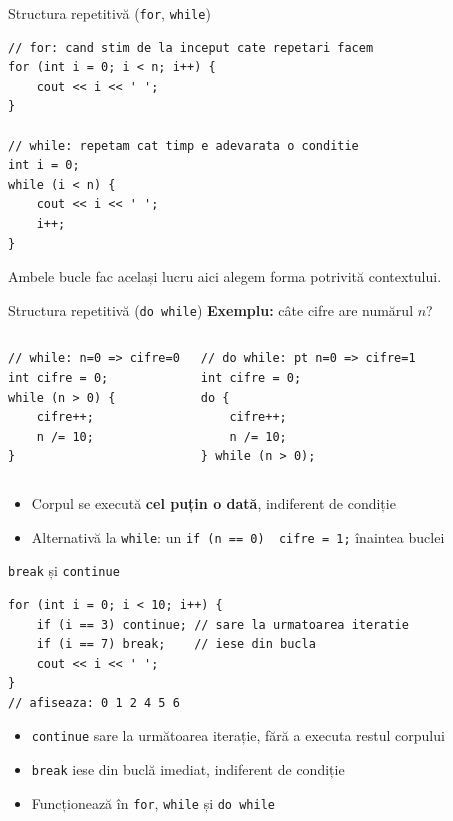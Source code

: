 \documentclass{beamer}
\begin{document}
\begin{frame}[fragile]{Structura repetitivă (\texttt{for}, \texttt{while})}
  \begin{lstlisting}
// for: cand stim de la inceput cate repetari facem
for (int i = 0; i < n; i++) {
    cout << i << ' ';
}

// while: repetam cat timp e adevarata o conditie
int i = 0;
while (i < n) {
    cout << i << ' ';
    i++;
}
  \end{lstlisting}
  Ambele bucle fac același lucru aici \textemdash{} alegem forma potrivită contextului.
\end{frame}

\begin{frame}[fragile]{Structura repetitivă (\texttt{do while})}
  \textbf{Exemplu:} câte cifre are numărul $n$?

  \begin{columns}[T]
    \begin{lstlisting}
// while: n=0 => cifre=0
int cifre = 0;
while (n > 0) {
    cifre++;
    n /= 10;
}
    \end{lstlisting}
    \begin{lstlisting}
// do while: pt n=0 => cifre=1
int cifre = 0;
do {
    cifre++;
    n /= 10;
} while (n > 0);
    \end{lstlisting}
  \end{columns}

  \begin{itemize}
    \item Corpul se execută \textbf{cel puțin o dată}, indiferent de condiție
    \item Alternativă la \lstinline|while|: un \lstinline|if (n == 0)  cifre = 1;| înaintea buclei
  \end{itemize}
\end{frame}

\begin{frame}[fragile]{\texttt{break} și \texttt{continue}}
  \begin{lstlisting}
for (int i = 0; i < 10; i++) {
    if (i == 3) continue; // sare la urmatoarea iteratie
    if (i == 7) break;    // iese din bucla
    cout << i << ' ';
}
// afiseaza: 0 1 2 4 5 6
  \end{lstlisting}
  \begin{itemize}
    \item \lstinline|continue| \textemdash{} sare la următoarea iterație, fără a executa restul corpului
    \item \lstinline|break| \textemdash{} iese din buclă imediat, indiferent de condiție
    \item Funcționează în \lstinline|for|, \lstinline|while| și \lstinline|do while|
  \end{itemize}
\end{frame}
\end{document}
